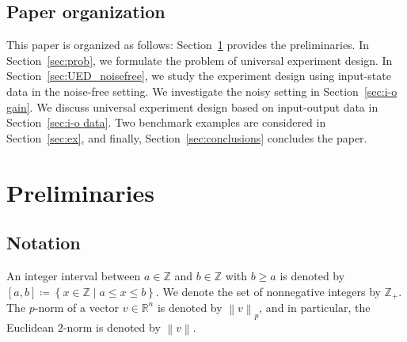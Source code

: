 \documentclass[journal,twoside,web]{ieeecolor}
\newcommand{\set}[2]{\left\{#1 \mid #2\right\}}
\newcommand{\norm}[1]{\left\|#1\right\|}
\begin{document}
\subsection{Paper organization}

This paper is organized as follows: Section~\ref{sec:pre} provides the preliminaries. In Section~\ref{sec:prob}, we formulate the problem of universal experiment design. In Section~\ref{sec:UED_noisefree}, we study the experiment design using input-state data in the noise-free setting. We investigate the noisy setting in Section~\ref{sec:i-o gain}. We discuss universal experiment design based on input-output data in Section~\ref{sec:i-o data}. Two benchmark examples are considered in Section~\ref{sec:ex}, and finally, Section~\ref{sec:conclusions} concludes the paper.


\section{Preliminaries}
\label{sec:pre}

\subsection{Notation}

An integer interval between $a\in\mathbb{Z}$ and $b\in\mathbb{Z}$ with $b\geq a$ is denoted by $[a,b]\coloneqq\set{x\in\mathbb{Z}}{a\leq x\leq b}$. We denote the set of nonnegative integers by $\mathbb{Z}_+$. The $p$-norm of a vector $v\in\mathbb{R}^n$ is denoted by $\norm{v}_p$, and in particular, the Euclidean $2$-norm is denoted by $\norm{v}$. 
\end{document}
